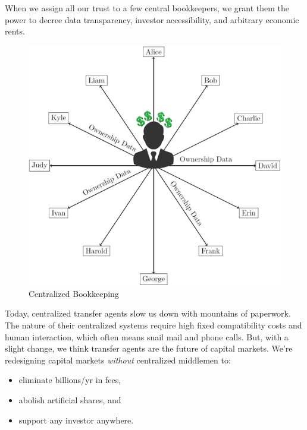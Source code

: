 \documentclass[11pt, english]{article}
\begin{document}
\begin{multicols}{2}

When we assign all our trust to a few central bookkeepers, we grant them the power to decree data transparency, investor accessibility, and arbitrary economic rents.

\begin{figure}[H]
    \raggedleft 
    \includegraphics[width=\linewidth]{imgs/centralized.png}
    \caption{Centralized Bookkeeping}
    \label{fig:centralized}
\end{figure}

Today, centralized transfer agents slow us down with mountains of paperwork. The nature of their centralized systems require high fixed compatibility costs and human interaction, which often means snail mail and phone calls. But, with a slight change, we think transfer agents are the future of capital markets. We're redesigning capital markets \hbox{\textit{without}} centralized middlemen to:
\begin{itemize}
    \item eliminate billions/yr in fees,
    
    \item abolish artificial shares, and
    
    \item support any investor anywhere.
\end{itemize}




\end{multicols}
\end{document}
